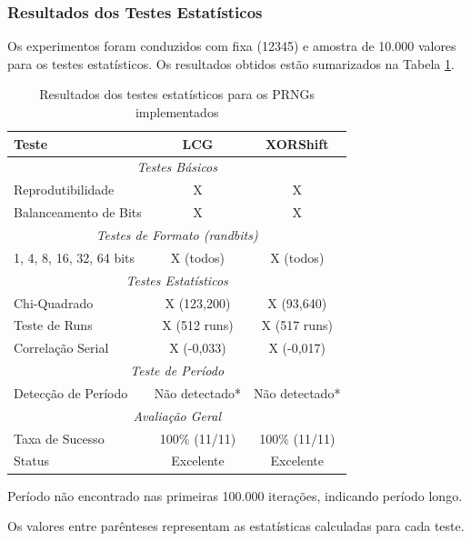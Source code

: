 \documentclass[a4paper, 11pt]{article}
\begin{document}
\subsubsection{Resultados dos Testes Estatísticos}

Os experimentos foram conduzidos com fixa (12345) e amostra de 10.000 valores para
os testes estatísticos. Os resultados obtidos estão sumarizados na Tabela
\ref{tab:statistical_tests}.

\begin{table}[h!]
\centering
\begin{threeparttable}
\caption{Resultados dos testes estatísticos para os PRNGs implementados}
\label{tab:statistical_tests}
\begin{tabular}{|l|c|c|}
\hline
\textbf{Teste} & \textbf{LCG} & \textbf{XORShift} \\
\hline
\multicolumn{3}{|c|}{\textit{Testes Básicos}} \\
\hline
Reprodutibilidade & X & X \\
Balanceamento de Bits & X & X \\
\hline
\multicolumn{3}{|c|}{\textit{Testes de Formato (randbits)}} \\
\hline
1, 4, 8, 16, 32, 64 bits & X (todos) & X (todos) \\
\hline
\multicolumn{3}{|c|}{\textit{Testes Estatísticos}} \\
\hline
Chi-Quadrado & X (123,200) & X (93,640) \\
Teste de Runs & X (512 runs) & X (517 runs) \\
Correlação Serial & X (-0,033) & X (-0,017) \\
\hline
\multicolumn{3}{|c|}{\textit{Teste de Período}} \\
\hline
Detecção de Período & Não detectado* & Não detectado* \\
\hline
\multicolumn{3}{|c|}{\textit{Avaliação Geral}} \\
\hline
Taxa de Sucesso & 100\% (11/11) & 100\% (11/11) \\
Status & Excelente & Excelente \\
\hline
\end{tabular}
\begin{tablenotes}
\small
\item * Período não encontrado nas primeiras 100.000 iterações, indicando período longo.
\item Os valores entre parênteses representam as estatísticas calculadas para cada
teste.
\end{tablenotes}
\end{threeparttable}
\end{table}
\end{document}
